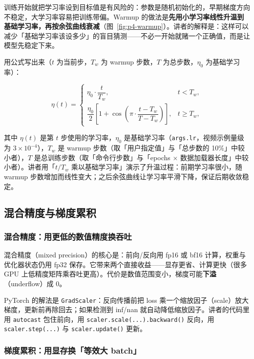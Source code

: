 训练开始就把学习率设到目标值是有风险的：参数是随机初始化的，早期梯度方向不稳定，大学习率容易把训练带偏。Warmup 的做法是\textbf{先用小学习率线性升温到基础学习率，再按余弦曲线衰减}（图~\ref{fig:p4-warmup}）。讲者的解释是：这样可以减少「基础学习率该设多少」的盲目猜测——不必一开始就赌一个正确值，而是让模型先稳定下来。

用公式写出来（$t$ 为当前步，$T_w$ 为 warmup 步数，$T$ 为总步数，$\eta_0$ 为基础学习率）：

$$
\eta(t)=
\begin{cases}
\eta_0\cdot \dfrac{t}{T_w}, & t<T_w,\\[2mm]
\dfrac{\eta_0}{2}\left[1+\cos\left(\pi\cdot\dfrac{t-T_w}{T-T_w}\right)\right], & t\ge T_w,
\end{cases}
$$

其中 $\eta(t)$ 是第 $t$ 步使用的学习率，$\eta_0$ 是基础学习率（\texttt{args.lr}，视频示例量级为 $3\times10^{-4}$），$T_w$ 是 warmup 步数（取「用户指定值」与「总步数的 10\%」中较小者），$T$ 是总训练步数（取「命令行步数」与「epochs $\times$ 数据加载器长度」中较小者）。讲者用「$t/T_w$ 乘以基础学习率」演示了升温过程：前期学习率很小，随 warmup 步数增加而线性变大；之后余弦曲线让学习率平滑下降，保证后期收敛稳定。

\subsection{混合精度与梯度累积}

\subsubsection{混合精度：用更低的数值精度换吞吐}

混合精度（mixed precision）的核心是：前向/反向用 fp16 或 bf16 计算，权重与优化器状态仍用 fp32 保存。它带来两个直接收益——显存更省、计算更快（很多 GPU 上低精度矩阵乘吞吐更高）。代价是数值范围变小，梯度可能\textbf{下溢}（underflow）成 0。

PyTorch 的解法是 \texttt{GradScaler}：反向传播前把 loss 乘一个缩放因子（scale）放大梯度，更新前再除回去；如果检测到 inf/nan 就自动降低缩放因子。讲者的代码里用 \texttt{autocast} 包住前向，用 \texttt{scaler.scale(...).backward()} 反向，用 \texttt{scaler.step(...)} 与 \texttt{scaler.update()} 更新。

\subsubsection{梯度累积：用显存换「等效大 batch」}


